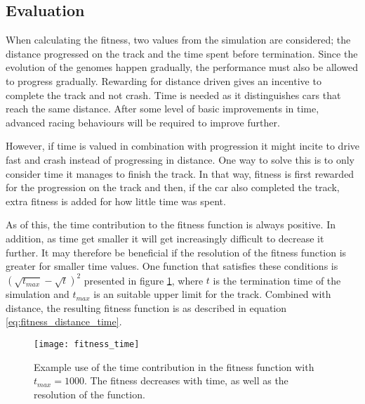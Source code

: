 \subsection{Evaluation}


When calculating the fitness, two values from the simulation are considered; the distance progressed on the track and the time spent before termination. Since the evolution of the genomes happen gradually, the performance must also be allowed to progress gradually. Rewarding for distance driven gives an incentive to complete the track and not crash. Time is needed as it distinguishes cars that reach the same distance. After some level of basic improvements in time, advanced racing behaviours will be required to improve further. 

However, if time is valued in combination with progression it might incite to drive fast and crash instead of progressing in distance. One way to solve this is to only consider time it manages to finish the track. In that way, fitness is first rewarded for the progression on the track and then, if the car also completed the track, extra fitness is added for how little time was spent.

As of this, the time contribution to the fitness function is always positive. In addition, as time get smaller it will get increasingly difficult to decrease it further. It may therefore be beneficial if the resolution of the fitness function is greater for smaller time values. One function that satisfies these conditions is \((\sqrt{t_{max}} - \sqrt{t})^2\) presented in figure \ref{figure:time_fitness}, where $t$ is the termination time of the simulation and $t_{max}$ is an suitable upper limit for the track. Combined with distance, the resulting fitness function is as described in equation \ref{eq:fitness_distance_time}.


\begin{figure}
\texttt{[image: fitness\_time]}
\caption{Example use of the time contribution in the fitness function with $t_{max} = 1000$. The fitness decreases with time, as well as the resolution of the function.}
\label{figure:time_fitness}
\centering
\end{figure}

